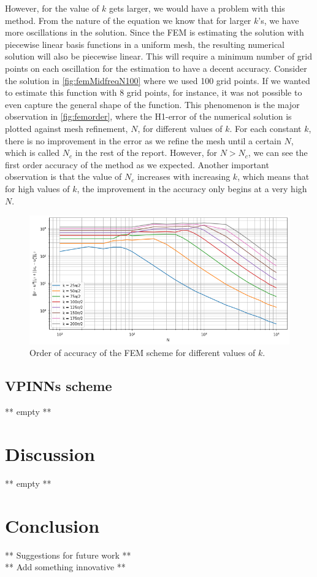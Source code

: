 However, for the value of $k$ gets larger, we would have a problem with this method. From the nature of the equation we
know that for larger $k$'s, we have more oscillations in the solution. Since the FEM is estimating the solution with
piecewise linear basis functions in a uniform mesh, the resulting numerical solution will also be piecewise linear. This
will require a minimum number of grid points on each oscillation for the estimation to have a decent accuracy. Consider
the solution in \autoref{fig:femMidfreqN100} where we used 100 grid points. If we wanted to estimate this function with
8 grid points, for instance, it was not possible to even capture the general shape of the function.
This phenomenon is the major observation in \autoref{fig:femorder}, where the H1-error of the numerical solution is plotted against
mesh refinement, $N$, for different values of $k$. For each constant $k$, there is no improvement in the error as we
refine the mesh until a certain $N$, which is called $N_c$ in the rest of the report. However, for $N > N_c$, we can
see the first order accuracy of the method as we expected.
Another important observation is that the value of $N_c$ increases with increasing $k$, which means that for high values
of $k$, the improvement in the accuracy only begins at a very high $N$.
\begin{figure}[h]
    \label{fig:femorder}
    \centering
    \includegraphics[width=.9\textwidth]{img/FEM-Order-Homog-H1.png}
    \caption{Order of accuracy of the FEM scheme for different values of $k$.}
\end{figure}

\subsection{VPINNs scheme}\label{sec:vpinnsresults}
** empty **

\section{Discussion}\label{sec:discussion}
** empty **

\section{Conclusion}\label{sec:conclusion}
** Suggestions for future work **\\
** Add something innovative **\\
